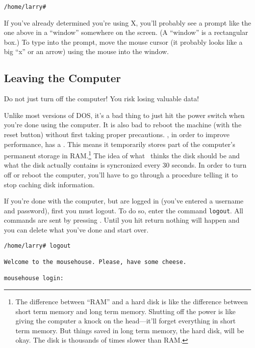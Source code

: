 \begin{screen}\begin{verbatim}
/home/larry#
\end{verbatim}\end{screen}

\xwarn If you've already determined you're using X, you'll
probably see a prompt like the one above in a ``window'' somewhere on
the screen. (A ``window'' is a rectangular box.)  To type into
the prompt, move the mouse cursor (it probably looks like a big ``x''
or an arrow) using the mouse into the window.

\subsection{Leaving the Computer}

\cautionpar Do not just turn off the computer! You risk losing
valuable data!

Unlike most versions of DOS, it's a bad thing to just hit
the power switch when you're done using the computer.  It is also bad
to reboot the machine (with the reset button) without first taking
proper precautions.  \linux, in order to improve performance, has a
.  This means it temporarily stores part of the
computer's permanent storage in RAM\@.\footnote{The difference between
  ``RAM'' and a hard disk is like the difference between short term
  memory and long term memory.  Shutting off the power is like giving
  the computer a knock on the head---it'll forget everything in short
  term memory.  But things saved in long term memory, the hard disk,
  will be okay.  The disk is thousands of times slower than RAM\@.}
The idea of what \linux\ thinks the disk should be and what the disk
actually contains is syncronized every 30 seconds.  In order to turn
off or reboot the computer, you'll have to go through a procedure
telling it to stop caching disk information.

If you're done with the computer, but are logged in (you've entered a
username and password), first you must logout. To do so, enter the
command {\tt logout}. All commands are sent by pressing \ret. Until
you hit return nothing will happen and you can delete what you've
done and start over.

\begin{screen}\begin{verbatim}
/home/larry# logout

Welcome to the mousehouse. Please, have some cheese.

mousehouse login:
\end{verbatim}\end{screen}


